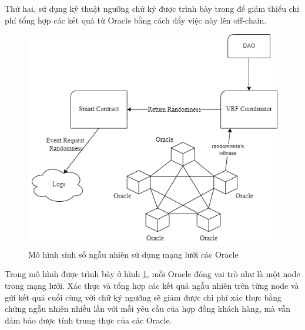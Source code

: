 \documentclass[../main.tex]{subfiles}
\begin{document}
Thứ hai, sử dụng kỹ thuật ngưỡng chữ ký được trình bày trong \cite{stinson2001provably} để giảm thiểu chi phí tổng hợp các kết quả từ Oracle bằng cách đẩy việc này lên off-chain.

\begin{figure}[h!]
    \centering
    \includegraphics[scale = 0.6]{Figure/thresholdSignature.png}
    \caption{Mô hình sinh số ngẫu nhiên sử dụng mạng lưới các Oracle}
    \label{fig:thresholdSignature}
\end{figure}

Trong mô hình được trình bày ở hình \ref{fig:thresholdSignature}, mỗi Oracle đóng vai trò như là một node trong mạng lưới. Xác thực và tổng hợp các kết quả ngẫu nhiên trên từng node và gửi kết quả cuối cùng với chữ ký ngưỡng sẽ giảm được chi phí xác thực bằng chứng ngẫu nhiên nhiều lần với mỗi yêu cầu của hợp đồng khách hàng, mà vẫn đảm bảo được tính trung thực của các Oracle.
\end{document}
